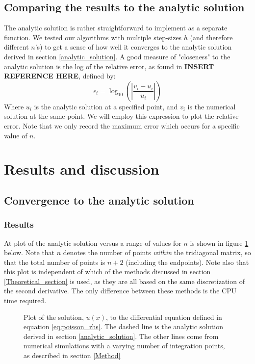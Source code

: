 \documentclass[a4paper, 10pt]{article}
\begin{document}
\subsection{Comparing the results to the analytic solution}\label{compare_error}
The analytic solution is rather straightforward to implement as a separate function. We tested our algorithms with multiple step-sizes $h$ (and therefore different $n$'s) to get a sense of how well it converges to the analytic solution derived in section \ref{analytic_solution}. A good measure of "closeness" to the analytic solution is the log of the relative error, as found in \textbf{INSERT REFERENCE HERE}, defined by:
\begin{equation}\label{eq:relative_error}
\epsilon_i=\log_{10}\left(\left|\frac{v_i-u_i}{u_i}\right|\right)
\end{equation}
Where $u_i$ is the analytic solution at a specified point, and $v_i$ is the numerical solution at the same point. We will employ this expression to plot the relative error. Note that we only record the maximum error which occurs for a specific value of $n$.

\section{Results and discussion}
\subsection{Convergence to the analytic solution}
\subsubsection{Results}
At plot of the analytic solution versus a range of values for $n$ is shown in figure \ref{fig:figure_1} below. Note that $n$ denotes the number of points \textit{within} the tridiagonal matrix, so that the total number of points is $n+2$ (including the endpoints). Note also that this plot is independent of which of the methods discussed in section \ref{Theoretical_section} is used, as they are all based on the same discretization of the second derivative. The only difference between these methods is the CPU time required.\\
\begin{figure}[h]
\caption{Plot of the solution, $u(x)$,  to the differential equation defined in equation
\ref{eq:poisson_rhs}. The dashed line is the analytic solution derived in section \ref{analytic_solution}. The other lines come from numerical simulations with a varying number of integration points, as described in section \ref{Method}}
\label{fig:figure_1}
\end{figure}
\end{document}
